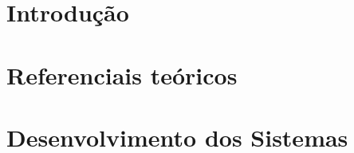 \documentclass[
	12pt,				%
	openright,			%
	twoside,			%
	a4paper,			%
	english,			%
	french,				%
	spanish,			%
	brazil				%
	]{abntex2}
\begin{document}
\listoftables*
\cleardoublepage



%

{
  \hypersetup{linkcolor=black}
  \tableofcontents*
}
\cleardoublepage

\part{Introdução}


\textual



\part{Referenciais teóricos}





\part{Desenvolvimento dos Sistemas}







\end{document}
